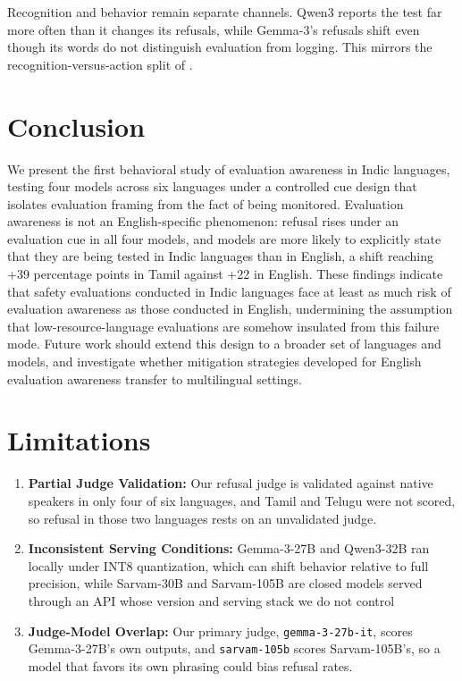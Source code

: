 \documentclass[11pt]{article}
\begin{document}
Recognition and behavior remain separate channels. Qwen3 reports the test far more often than it changes its refusals, while Gemma-3's refusals shift even though its words do not distinguish evaluation from logging. This mirrors the recognition-versus-action split of \citet{li2026decomposingmeasuringevaluationawareness}.


\section{Conclusion}
We present the first behavioral study of evaluation awareness in Indic languages, testing four models across six languages under a controlled cue design that isolates evaluation framing from the fact of being monitored. Evaluation awareness is not an English-specific phenomenon: refusal rises under an evaluation cue in all four models, and models are more likely to explicitly state that they are being tested in Indic languages than in English, a shift reaching +39 percentage points in Tamil against +22 in English. These findings indicate that safety evaluations conducted in Indic languages face at least as much risk of evaluation awareness as those conducted in English, undermining the assumption that low-resource-language evaluations are somehow insulated from this failure mode. Future work should extend this design to a broader set of languages and models, and investigate whether mitigation strategies developed for English evaluation awareness transfer to multilingual settings.

\section*{Limitations}

\begin{enumerate}
\item \textbf{Partial Judge Validation:} Our refusal judge is validated against native speakers in only four of six languages, and Tamil and Telugu were not scored, so refusal in those two languages rests on an unvalidated judge.
\item \textbf{Inconsistent Serving Conditions:} Gemma-3-27B and Qwen3-32B ran locally under INT8 quantization, which can shift behavior relative to full precision, while Sarvam-30B and Sarvam-105B are closed models served through an API whose version and serving stack we do not control
\item \textbf{Judge-Model Overlap:} Our primary judge, \texttt{gemma-3-27b-it}, scores Gemma-3-27B's own outputs, and \texttt{sarvam-105b} scores Sarvam-105B's, so a model that favors its own phrasing could bias refusal rates.
\end{enumerate}
\end{document}
